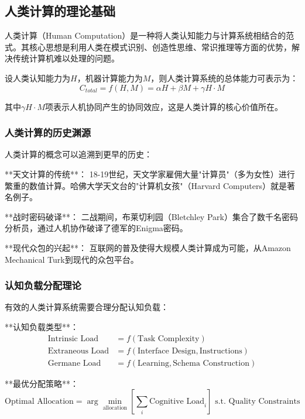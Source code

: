 \subsection{人类计算的理论基础}

人类计算（Human Computation）是一种将人类认知能力与计算系统相结合的范式。其核心思想是利用人类在模式识别、创造性思维、常识推理等方面的优势，解决传统计算机难以处理的问题。

设人类认知能力为$H$，机器计算能力为$M$，则人类计算系统的总体能力可表示为：
\begin{equation}
C_{total} = f(H, M) = \alpha H + \beta M + \gamma H \cdot M
\end{equation}

其中$\gamma H \cdot M$项表示人机协同产生的协同效应，这是人类计算的核心价值所在。

\subsubsection{人类计算的历史渊源} %

人类计算的概念可以追溯到更早的历史：

**天文计算的传统**：
18-19世纪，天文学家雇佣大量"计算员"（多为女性）进行繁重的数值计算。哈佛大学天文台的"计算机女孩"（Harvard Computers）就是著名例子。

**战时密码破译**：
二战期间，布莱切利园（Bletchley Park）集合了数千名密码分析员，通过人机协作破译了德军的Enigma密码。

**现代众包的兴起**：
互联网的普及使得大规模人类计算成为可能，从Amazon Mechanical Turk到现代的众包平台。

\subsubsection{认知负载分配理论} %

有效的人类计算系统需要合理分配认知负载：

**认知负载类型**：
\begin{align}
\text{Intrinsic Load} &= f(\text{Task Complexity}) \\
\text{Extraneous Load} &= f(\text{Interface Design}, \text{Instructions}) \\
\text{Germane Load} &= f(\text{Learning}, \text{Schema Construction})
\end{align}

**最优分配策略**：
\begin{equation}
\text{Optimal Allocation} = \arg\min_{\text{allocation}} \left[ \sum_i \text{Cognitive Load}_i \right] \text{ s.t. } \text{Quality Constraints}
\end{equation}

